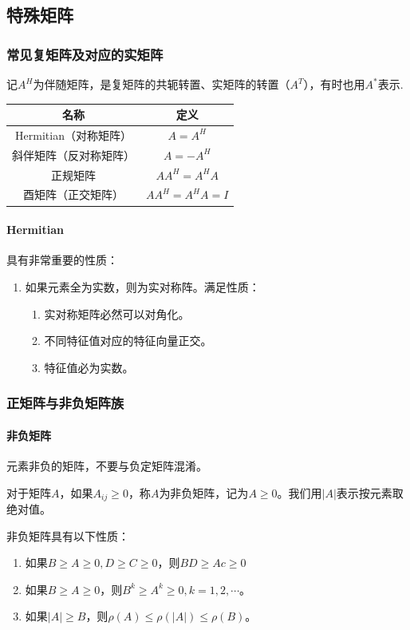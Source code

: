 \subsection{特殊矩阵}
\subsubsection{常见复矩阵及对应的实矩阵}
记$A^H$为伴随矩阵，是复矩阵的共轭转置、实矩阵的转置（$A^T$），有时也用$A^*$表示.

\begin{longtable}{c c}
	\toprule
	名称& 定义 \\
	\midrule
	Hermitian（对称矩阵） &$A=A^H$ \\
	斜伴矩阵（反对称矩阵）&$A=-A^H$\\
	正规矩阵& $AA^H=A^H A$\\
	酉矩阵（正交矩阵）& $AA^H=A^H A=I$\\
	\bottomrule
\end{longtable}

\paragraph*{Hermitian}具有非常重要的性质：
\begin{enumerate}
\item 如果元素全为实数，则为实对称阵。满足性质：
\begin{enumerate}
\item 实对称矩阵必然可以对角化。
\item 不同特征值对应的特征向量正交。
\item 特征值必为实数。
\end{enumerate}
\end{enumerate}
\subsubsection{正矩阵与非负矩阵族}
\paragraph*{非负矩阵}元素非负的矩阵，不要与负定矩阵混淆。

\begin{definition}[非负矩阵]
对于矩阵$A$，如果$A_{ij}\geq 0$，称$A$为非负矩阵，记为$A\geq 0$。我们用$|A|$表示按元素取绝对值。

非负矩阵具有以下性质：
\begin{enumerate}
\item 如果$B\geq A\geq 0,D\geq C\geq 0$，则$BD\geq Ac\geq 0$
\item 如果$B\geq A\geq 0$，则$B^k\geq A^k\geq 0,k=1,2,\cdots$。
\item 如果$|A|\geq B$，则$\rho(A)\leq\rho(|A|)\leq \rho(B)$。
\end{enumerate}
\end{definition}


